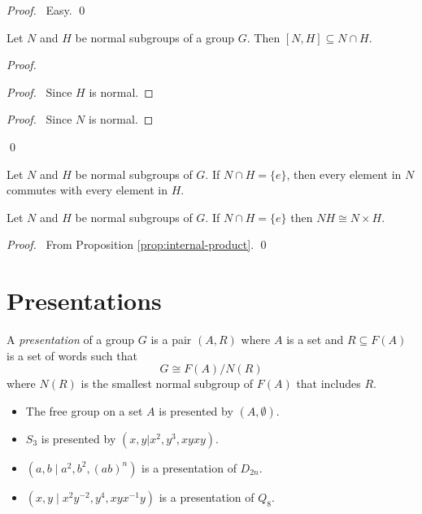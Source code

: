 \begin{proof}
\pf\ Easy. \qed
\end{proof}

\begin{lm}
Let $N$ and $H$ be normal subgroups of a group $G$. Then $[N,H] \subseteq N \cap H$.
\end{lm}

\begin{proof}
\pf
{}
\begin{proof}
	\pf\ Since $H$ is normal.
\end{proof}
\begin{proof}
	\pf\ Since $N$ is normal.
\end{proof}
\qed
\end{proof}

\begin{cor}
\label{cor:N-H-commute}
Let $N$ and $H$ be normal subgroups of $G$. If $N \cap H = \{e\}$, then every element in $N$ commutes with every element in $H$.
\end{cor}

\begin{prop}
\label{prop:NH-cong-N-times-H}
Let $N$ and $H$ be normal subgroups of $G$. If $N \cap H = \{e\}$ then $NH \cong N \times H$.
\end{prop}

\begin{proof}
\pf\ From Proposition \ref{prop:internal-product}. \qed
\end{proof}

\section{Presentations}

\begin{df}[Presentation]
A \emph{presentation} of a group $G$ is a pair $(A,R)$ where $A$ is a set and $R \subseteq F(A)$ is a set of words such that
\[ G \cong F(A) / N(R) \]
where $N(R)$ is the smallest normal subgroup of $F(A)$ that includes $R$.
\end{df}

\begin{ex}
\begin{itemize}
\item The free group on a set $A$ is presented by $(A, \emptyset)$.
\item $S_3$ is presented by $(x,y|x^2,y^3,xyxy)$.
\item 
$(a,b \mid a^2, b^2, (ab)^n)$ is a presentation of $D_{2n}$.
\item $(x,y \mid x^2 y^{-2}, y^4, xyx^{-1}y)$ is a presentation of $Q_8$.
\end{itemize}
\end{ex}

